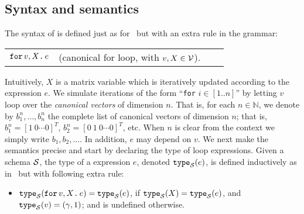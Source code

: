 \subsection{Syntax and semantics} The syntax of \langfor is defined just as for \lang\, but with an extra rule in the grammar:
\medskip

\begin{tabular}{lcll}
 $\texttt{for}\, v,X \texttt{.}\, e$ & (canonical for loop, with $v, X \in \mathcal{V}$). 
\end{tabular}

\medskip
Intuitively, $X$ is a matrix variable which is iteratively updated according to the expression $e$. We simulate iterations of the form ``\texttt{for} $i\in [1..n]$'' by letting $v$ loop over the \textit{canonical vectors} of dimension $n$. That is,
for each $n\in \mathbb{N}$, we denote by $b_1^n,\ldots ,b_n^n$ the complete list of canonical vectors of dimension $n$; that is, $b_1^n = [1\ 0 \cdots 0]^T$, $b_2^n = [0\ 1\ 0 \cdots 0]^T$, etc. When $n$ is clear from the context we simply write $b_1,b_2,\ldots$. In addition, $e$ may depend on $v$. We next make the semantics precise and start by
declaring the type of loop expressions.
Given a schema $\mathcal{S}$, the type of a \langfor expression $e$, denoted $\texttt{type}_{\mathcal{S}}(e)$, is defined inductively as in \lang\, but with following extra rule:
\begin{itemize}
\item $\texttt{type}_{\mathcal{S}}(\texttt{for}\, v,X \texttt{.}\, e) = \texttt{type}_{\mathcal{S}}(e)$, if $\texttt{type}_{\mathcal{S}}(X) = \texttt{type}_{\mathcal{S}}(e)$, and $\texttt{type}_{\mathcal{S}}(v) = (\gamma,1)$; and is undefined otherwise.
\end{itemize}


